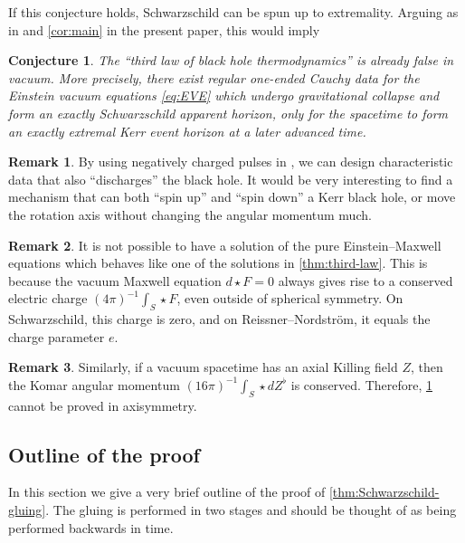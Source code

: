 \documentclass[10pt]{article}
\numberwithin{equation}{section}
\theoremstyle{plain}
\newtheorem{conj}{Conjecture}
\theoremstyle{definition}
\newtheorem{rk}{Remark}[section]
\begin{document}
If this conjecture holds, Schwarzschild can be spun up to extremality. Arguing as in \cite{KU22} and \cref{cor:main} in the present paper, this would imply

\begin{conj}\label{conj:third-law-vac} The ``third law of black hole thermodynamics'' is already false in vacuum. More precisely, there exist regular one-ended Cauchy data for the  Einstein vacuum equations \eqref{eq:EVE} which undergo gravitational collapse and form an exactly Schwarzschild apparent horizon, only for the spacetime to form an exactly extremal Kerr event horizon at a later advanced time. 
\end{conj}

\begin{rk}
    By using negatively charged pulses in \cite{KU22}, we can design characteristic data that also ``discharges'' the black hole. It would be very interesting to find a mechanism that can both ``spin up'' and ``spin down'' a Kerr black hole, or move the rotation axis without changing the angular momentum much. 
\end{rk}

\begin{rk}
    It is not possible to have a solution of the pure Einstein--Maxwell equations which behaves like one of the solutions in \cref{thm:third-law}. This is because the vacuum Maxwell equation ${d}{\star}F=0$ always gives rise to a conserved electric charge $(4\pi)^{-1}\int_S \star F$, even outside of spherical symmetry. On Schwarzschild, this charge is zero, and on Reissner--Nordstr\"om, it equals the charge parameter $e$. 
\end{rk}

\begin{rk}
    Similarly, if a vacuum spacetime has an axial Killing field $Z$, then the Komar angular momentum $(16\pi)^{-1}\int_S \star dZ^\flat$ is conserved. Therefore, \cref{conj:third-law-vac} cannot be proved in axisymmetry. 
\end{rk}

\subsection{Outline of the proof}\label{sec:proof-outline}

In this section we give a very brief outline of the proof of \cref{thm:Schwarzschild-gluing}. The gluing is performed in two stages and should be thought of as being performed backwards in time. 
\end{document}
